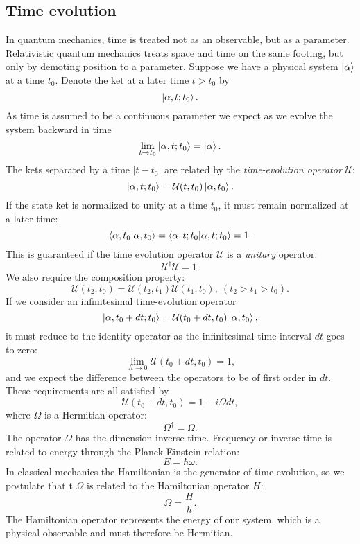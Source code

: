 \subsection{Time evolution}
In quantum mechanics, time is treated not as an observable,
but as a parameter. Relativistic quantum mechanics
treats space and time on the same footing, but only by demoting
position to a parameter.
\newline
Suppose we have a physical system $\ket{\alpha}$
at a time $t_0$. Denote the ket at a later time $t > t_0$ by
$$ \ket{\alpha, t; t_0} .$$
As time is assumed to be a continuous parameter we expect
as we evolve the system backward in time
$$ \lim_{t \rightarrow t_0} \ket{\alpha, t; t_0}
= \ket{\alpha} .$$
The kets separated by a time $\left| t - t_0 \right|$
are related by the \textit{time-evolution operator} $\mathcal{U}$:
$$ \ket{\alpha, t; t_0} = \mathcal{U}(t, t_0) \ket{\alpha, t_0} .$$
If the state ket is normalized to unity at a time $t_0$,
it must remain normalized at a later time:
$$ \braket{\alpha, t_0 | \alpha, t_0} = \braket{\alpha, t; t_0
    | \alpha, t; t_0} = 1 .$$
This is guaranteed if the time evolution operator 
$\mathcal{U}$ is a \textit{unitary} operator:
$$ \mathcal{U}^{\dagger} \mathcal{U} = 1 .$$
We also require the composition property:
$$ \mathcal{U}(t_2, t_0) = \mathcal{U}(t_2, t_1)
    \mathcal{U}(t_1, t_0), ~ (t_2 > t_1 > t_0) .$$
\newline
If we consider an infinitesimal time-evolution operator
$$ \ket{\alpha, t_0 + dt; t_0} = \mathcal{U}(t_0 + dt, t_0)
\ket{\alpha, t_0} ,$$
it must reduce to the identity operator as the infinitesimal
time interval $dt$ goes to zero:
$$ \lim_{dt \rightarrow 0} \mathcal{U}(t_0 + dt, t_0) = 1, $$
and we expect the difference between the operators
to be of first order in $dt$.
\newline
These requirements are all satisfied by
$$ \mathcal{U}(t_0 + dt, t_0) = 1 - i\Omega dt ,$$
where $\Omega$ is a Hermitian operator:
$$ \Omega^{\dagger} = \Omega .$$
The operator $\Omega$ has the dimension inverse time.
Frequency or inverse time is related to energy
through the Planck-Einstein relation:
$$ E = \hbar \omega .$$
In classical mechanics the Hamiltonian is the generator of time evolution,
so we postulate that t $\Omega$ is related to the Hamiltonian operator
$H$:
$$ \Omega = \frac{H}{\hbar} .$$
The Hamiltonian operator represents the energy of our system,
which is a physical observable and must therefore be Hermitian.

